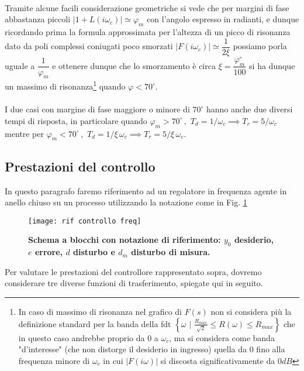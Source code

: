 \documentclass[a4paper]{article}
\begin{document}
	\\Tramite alcune facili considerazione geometriche si vede che per margini di fase abbastanza piccoli $ |1+L(i\omega_c)|\simeq\varphi_m $ con l'angolo espresso in radianti, e dunque ricordando prima la formula approssimata per l'altezza di un picco di risonanza dato da poli complessi coniugati poco smorzati $ |F(i\omega_c)|\simeq\dfrac{1}{2\xi} $ possiamo porla uguale a $ \dfrac{1}{\varphi_m} $ e ottenere dunque che lo smorzamento è circa $ \xi=\dfrac{\varphi_{m}^{\circ}}{100} $ si ha dunque un massimo di risonanza\footnote{In caso di massimo di risonanza nel grafico di $ F(s) $ non si considera più la definizione standard per la banda della fdt $\left\lbrace \omega \,\,|\,\,\frac{R_{max}}{\sqrt{2}}\le R(\omega) \le R_{max}\right\rbrace$ che in questo caso andrebbe proprio da 0 a $ \omega_c $, ma si considera come banda "d'interesse" (che non distorge il desiderio in ingresso) quella da 0 fino alla frequenza minore di $ \omega_c $ in cui $ |F(i\omega)| $ si discosta significativamente da $ 0dB $} quando $ \varphi<70^{\circ} $. \\\\I due casi con margine di fase maggiore o minore di $70^{\circ} $ hanno anche due diversi tempi di risposta, in particolare quando $\varphi_m>70^{\circ}\,,\,\,T_d=1/\omega_c\implies T_r=5/\omega_c $ mentre per $\varphi_m<70^{\circ}\,,\,\,T_d=1/\xi\,\omega_c\implies T_r=5/\xi\,\omega_c $.
	
	
	\subsection{Prestazioni del controllo}
	In questo paragrafo faremo riferimento ad un regolatore in frequenza agente in anello chiuso su un processo utilizzando la notazione come in Fig. \ref{rif controllo freq}
	\begin{figure}[H]
		\centering
		\texttt{[image: rif controllo freq]}
		\caption{\textbf{Schema a blocchi con notazione di riferimento: $y_0$ desiderio, $e$ errore, $d$ disturbo e $d_m$ disturbo di misura.}}\label{rif controllo freq}
	\end{figure}
	Per valutare le prestazioni del controllore rappresentato sopra, dovremo considerare tre diverse funzioni di trasferimento, spiegate qui in seguito.
\end{document}
